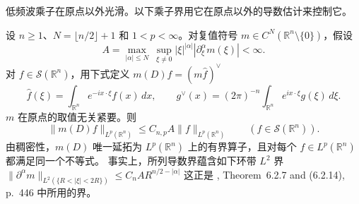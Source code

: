 低频波乘子在原点以外光滑。以下乘子界用它在原点以外的导数估计来控制它。

\begin{Proposition}\label{ext:mihlin-multiplier}
设 $n\ge1$、$N=\lfloor n/2\rfloor+1$ 和 $1<p<\infty$。对复值符号 $m\in C^N(\mathbb R^n\setminus\{0\})$，假设
\[
 A=\max_{|\alpha|\le N}\ \sup_{\xi\ne0}|\xi|^{|\alpha|}
             |\partial_\xi^\alpha m(\xi)|<\infty.
\]
对 $f\in\mathcal S(\mathbb R^n)$，用下式定义 $m(D)f=(m\widehat f)^\vee$
\[
 \widehat f(\xi)=\int_{\mathbb R^n}e^{-ix\cdot\xi}f(x)\,dx,\qquad
 g^\vee(x)=(2\pi)^{-n}\int_{\mathbb R^n}e^{ix\cdot\xi}g(\xi)\,d\xi .
\]
$m$ 在原点的取值无关紧要。则
\[
 \|m(D)f\|_{L^p(\mathbb R^n)}
 \le C_{n,p} A\|f\|_{L^p(\mathbb R^n)}
 \qquad (f\in\mathcal S(\mathbb R^n)).
\]
由稠密性，$m(D)$ 唯一延拓为 $L^p(\mathbb R^n)$ 上的有界算子，且对每个 $f\in L^p(\mathbb R^n)$ 都满足同一个不等式。
事实上，所列导数界蕴含如下环带 $L^2$ 界
$\|\partial^\alpha m\|_{L^2(\{R<|\xi|<2R\})}\le C_n A R^{n/2-|\alpha|}$
这正是 \cite{r-32}, Theorem~6.2.7 and (6.2.14), p.~446 中所用的界。
\end{Proposition}
